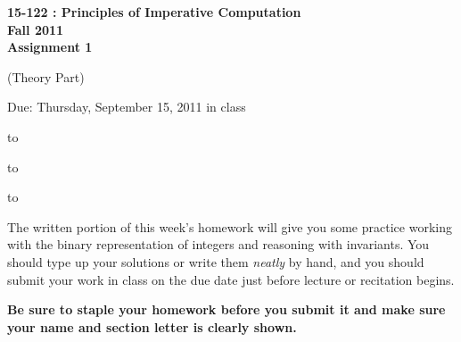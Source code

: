 \documentclass[12pt]{exam}
\begin{document}
\addpoints
\begin{center}
\textbf{\large{15-122 : Principles of Imperative Computation
 \\ \vspace{0.2in} Fall 2011
\\  \vspace{0.2in} Assignment 1
}}

 \vspace{0.2in}
 (\large{Theory Part})

 \vspace{0.2in}

 \large{Due: Thursday, September 15, 2011 in class}
\end{center}

\vspace{0.5in}

\hbox to \textwidth{Name:\enspace\hrulefill}


\vspace{0.2in}

\hbox to \textwidth{Andrew ID:\enspace\hrulefill}

\vspace{0.2in}

\hbox to \textwidth{Recitation:\enspace\hrulefill}



\vspace{0.5in}

\noindent The written portion of this week's homework will give you some practice
working with the binary representation of integers and reasoning with
invariants.  You should type up your solutions or write them
\textit{neatly} by hand, and you should submit your work in class on the
due date just before lecture or recitation begins.
\vspace{0.2in}

\noindent \textbf{Be sure to staple your homework
before you submit it and make sure your name and section letter is
clearly shown.}

\vspace{0.2in}

\begin{center}
\gradetable[v][questions]
\end{center}
\end{document}
